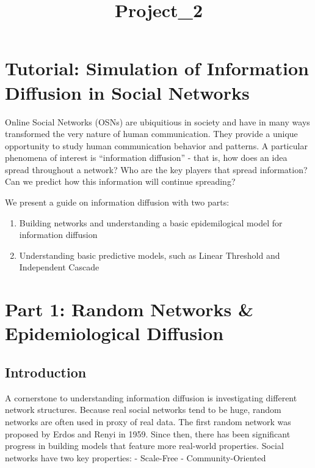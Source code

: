 \documentclass[11pt]{article}
\title{Project\_2}
\providecommand{\tightlist}{%
      \setlength{\itemsep}{0pt}\setlength{\parskip}{0pt}}
\begin{document}
    
    \maketitle
    
    

    
    \hypertarget{tutorial-simulation-of-information-diffusion-in-social-networks}{%
\section{Tutorial: Simulation of Information Diffusion in Social
Networks}\label{tutorial-simulation-of-information-diffusion-in-social-networks}}

Online Social Networks (OSNs) are ubiquitious in society and have in
many ways transformed the very nature of human communication. They
provide a unique opportunity to study human communication behavior and
patterns. A particular phenomena of interest is ``information
diffusion'' - that is, how does an idea spread throughout a network? Who
are the key players that spread information? Can we predict how this
information will continue spreading?

We present a guide on information diffusion with two parts:

\begin{enumerate}
\def\labelenumi{\arabic{enumi}.}
\tightlist
\item
  Building networks and understanding a basic epidemilogical model for
  information diffusion
\item
  Understanding basic predictive models, such as Linear Threshold and
  Independent Cascade
\end{enumerate}

    \hypertarget{part-1-random-networks-epidemiological-diffusion}{%
\section{Part 1: Random Networks \& Epidemiological
Diffusion}\label{part-1-random-networks-epidemiological-diffusion}}

    \hypertarget{introduction}{%
\subsection{Introduction}\label{introduction}}

A cornerstone to understanding information diffusion is investigating
different network structures. Because real social networks tend to be
huge, random networks are often used in proxy of real data. The first
random network was proposed by Erdos and Renyi in 1959. Since then,
there has been significant progress in building models that feature more
real-world properties. Social networks have two key properties: -
Scale-Free - Community-Oriented
\end{document}
